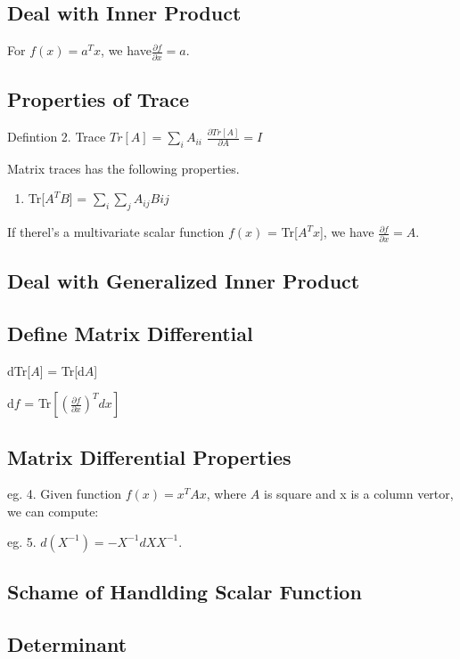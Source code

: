 \documentclass{article}
\begin{document}
\subsection{Deal with Inner Product}
For $f(x) = a^T x$, we have$ \frac{\partial f}{\partial
x} = a $.

\subsection{Properties of Trace}
Defintion 2. Trace $ Tr [A] = \sum_i A_{ii} $
$\frac{\partial Tr [A] }{\partial A} = I$
\begin{theorem}
    Matrix traces has the following properties.
    \begin{enumerate}
        \item Tr[$A^TB$] = $\sum_i\sum_j A_{ij}B{ij}$
    \end{enumerate}
\end{theorem}
If therel's a multivariate scalar function $f(x)$ = Tr[$A^Tx$], we have $\frac{\partial f}{\partial x} = A $.

\subsection{Deal with Generalized Inner Product}

\subsection{Define Matrix Differential}
dTr[$A$] = Tr[d$A$]

d$f$ = Tr$\left[ (\frac{\partial f}{\partial x})^T d x \right] $

\subsection{Matrix Differential Properties}

eg. 4. Given function $ f(x) = x^T A x$, where $A$ is square and x is a column vertor, we can compute:

eg. 5. $d(X^{-1}) = -X^{-1}dX X^{-1} $.

\subsection{Schame of Handlding Scalar Function}

\subsection{Determinant}
\end{document}
